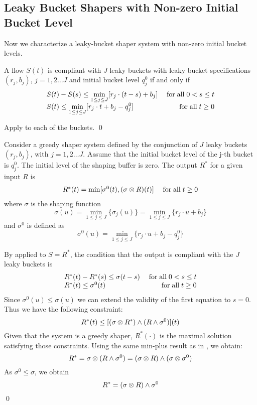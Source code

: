 \subsection{Leaky Bucket Shapers with Non-zero Initial Bucket Level}
 Now we characterize a leaky-bucket shaper
system with non-zero initial bucket levels.

\begin{proposition}  A flow $S(t)$ is compliant
with $J$ leaky buckets with leaky bucket specifications
$(r_j,b_j)$, $j=1,2 \dots J$ and initial bucket level $q_j^0$ if
and only if
\[
\begin{array}{lr}
S(t) - S(s) \leq
        \displaystyle\min_{1 \leq j \leq J}[r_j \cdot (t-s) +b_j]
        & \mathrm{\; for \; all \; } 0 < s\leq t \\
S(t) \leq \displaystyle \min_{1 \leq j \leq J} [ r_j \cdot t +
                b_j - q_j^0 ]
        & \mathrm{\; for \; all \; } t \geq 0 \\
\end{array}
\]
\end{proposition}
\pr
Apply  to each of the buckets. \qed

\begin{proposition}  Consider a greedy
shaper system defined by the conjunction of $J$ leaky buckets
$(r_j,b_j)$, with $j=1,2 \dots J$. Assume that the initial bucket
level of the j-th bucket is $q_j^0$. The initial level of the
shaping buffer is zero. The output $R^*$ for a given input $R$ is
\begin{equation}
\mylabel{l23b-enzlb}
\begin{array}{lr}
R^*(t)= \min [\sigma^0(t), (\sigma \mpc R)(t)]&\mfa t \geq 0
\end{array}
\end{equation}
where $\sigma$ is the shaping function
\[
\sigma(u)=\displaystyle \min_{1 \leq j \leq J}\{\sigma_j(u)\}
        = \displaystyle\min_{1 \leq j \leq J}\{r_j \cdot u+b_j\}
\]
and $\sigma^0$ is defined as
\[
\sigma^0(u)=\displaystyle \min_{1 \leq j \leq J} \{ r_j \cdot u +
                b_j - q_j^0 \}
\]
\end{proposition}
\pr By  applied to $S=R^*$, the condition that
the output is compliant with the $J$ leaky buckets is
\[
\begin{array}{lr}
R^*(t) - R^*(s) \leq \sigma(t-s) & \mathrm{\; for \; all \; } 0 < s\leq t \\ R^*(t) \leq
\sigma^0(t) & \mathrm{\; for \; all \; } t \geq 0 \\
\end{array}
\]
Since $\sigma^0(u) \leq \sigma(u)$ we can extend the validity of
the first equation to $s=0$. Thus we have the following
constraint:
\[
R^*(t) \leq [(\sigma \otimes R^*) \wedge (R  \wedge \sigma^0)](t)
\]
Given that the system is a greedy shaper, $R^*(\cdot)$ is the
maximal solution satisfying those constraints. Using the same
min-plus result as in , we obtain:
$$
R^* = \sigma \otimes (R  \wedge \sigma^0)= (\sigma \otimes R) \wedge
(\sigma \otimes \sigma^0)$$
 As $\sigma^0 \leq \sigma$, we obtain
 $$R^* = (\sigma \otimes R) \wedge
\sigma^0
 $$
\qed

